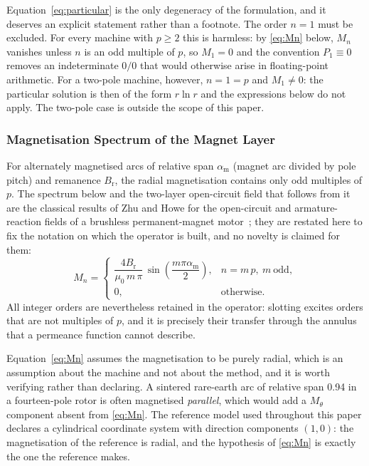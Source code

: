 \documentclass[10pt,a4paper,twocolumn]{article}
\theoremstyle{plain}
\theoremstyle{remark}
\begin{document}
Equation~\eqref{eq:particular} is the only degeneracy of the
formulation, and it deserves an explicit statement rather than a
footnote. The order $n=1$ must be excluded. For every machine with
$p\ge2$ this is harmless: by \eqref{eq:Mn} below, $M_n$ vanishes unless
$n$ is an odd multiple of $p$, so $M_1=0$ and the convention $P_1\equiv0$
removes an indeterminate $0/0$ that would otherwise arise in
floating-point arithmetic. For a two-pole machine, however, $n=1=p$ and
$M_1\neq0$: the particular solution is then of the form $r\ln r$ and the
expressions below do not apply. The two-pole case is outside the scope
of this paper.

\subsubsection{Magnetisation Spectrum of the Magnet Layer}

For alternately magnetised arcs of relative span $\alpha_{\mathrm{m}}$
(magnet arc divided by pole pitch) and remanence $B_{\mathrm{r}}$, the
radial magnetisation contains only odd multiples of $p$. The spectrum
below and the two-layer open-circuit field that follows from it are the
classical results of Zhu and Howe for the open-circuit and
armature-reaction fields of a brushless permanent-magnet
motor~\cite{zhu1993a,zhu1993b}; they are restated here to fix the
notation on which the operator is built, and no novelty is claimed for
them:
\begin{equation}
M_n =
\begin{cases}
\dfrac{4B_{\mathrm{r}}}{\mu_0\,m\,\pi}\,
\sin\!\left(\dfrac{m\pi\alpha_{\mathrm{m}}}{2}\right),
& n = m\,p,\ m\ \text{odd},\\[2ex]
0, & \text{otherwise.}
\end{cases}
\label{eq:Mn}
\end{equation}
All integer orders are nevertheless retained in the operator: slotting
excites orders that are not multiples of $p$, and it is precisely their
transfer through the annulus that a permeance function cannot describe.

Equation~\eqref{eq:Mn} assumes the magnetisation to be purely radial,
which is an assumption about the machine and not about the method, and
it is worth verifying rather than declaring. A sintered rare-earth arc
of relative span \num{0.94} in a fourteen-pole rotor is often magnetised
\emph{parallel}, which would add a $M_\theta$ component absent from
\eqref{eq:Mn}. The reference model used throughout this paper declares
a cylindrical coordinate system with direction components
$(1,0)$: the magnetisation of the reference is radial, and the
hypothesis of \eqref{eq:Mn} is exactly the one the reference makes.
\end{document}

